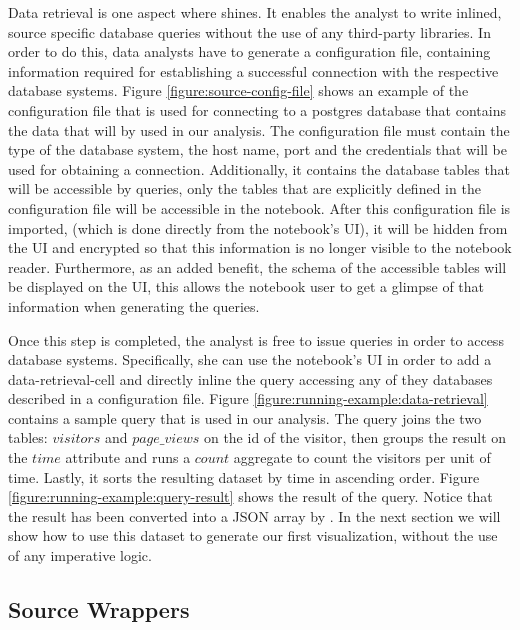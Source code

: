 Data retrieval is one aspect where {\projname} shines. It enables the analyst to write inlined, source specific database queries without the use of any third-party libraries. In order to do this, data analysts have to generate a configuration file, containing information required for establishing a successful connection with the respective database systems. Figure \ref{figure:source-config-file} shows an example of the configuration file that is used for connecting to a postgres database that contains the data that will by used in our analysis. The configuration file must contain the type of the database system, the host name, port and the credentials that will be used for obtaining a connection. Additionally, it contains the database tables that will be accessible by queries, only the tables that are explicitly defined in the configuration file will be accessible in the notebook. After this configuration file is imported, (which is done directly from the notebook's UI), it will be hidden from the UI and encrypted so that this information is no longer visible to the notebook reader.  Furthermore, as an added benefit, the schema of the accessible tables will be displayed on the UI, this allows the notebook user to get a glimpse of that information when generating the queries. 



Once this step is completed, the analyst is free to issue queries in order to access database systems. Specifically, she can use the notebook's UI in order to add a data-retrieval-cell and directly inline the query accessing any of they databases described in a configuration file. Figure \ref{figure:running-example:data-retrieval} contains a sample query that is used in our analysis. The query joins the two tables: $visitors$ and $page\_views$ on the id of the visitor, then groups the result on the $time$ attribute and runs a $count$ aggregate to count the visitors per unit of time. Lastly, it sorts the resulting dataset by time in ascending order. Figure \ref{figure:running-example:query-result} shows the result of the query. Notice that the result has been converted into a JSON array by \projname. In the next section we will show how to use this dataset to generate our first visualization, without the use of any imperative logic.

\subsection{Source Wrappers}
\label{subsection:source-wrappers}


